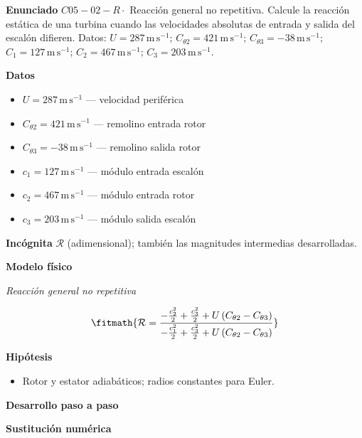 \documentclass[10pt,openany]{book}
\begin{document}
\begin{tcolorbox}[title={Problema resuelto 2}, studiumworked, breakable]

\noindent\textbf{Enunciado}
\(C05-02-R \cdot\) Reacción general no repetitiva. Calcule la reacción estática de una turbina cuando las velocidades absolutas de entrada y salida del escalón difieren. Datos: \(U=287\, \mathrm{m}\,\mathrm{s}^{-1}\); \(C_{\theta2}=421\, \mathrm{m}\,\mathrm{s}^{-1}\); \(C_{\theta3}=-38\, \mathrm{m}\,\mathrm{s}^{-1}\); \(C_1=127\, \mathrm{m}\,\mathrm{s}^{-1}\); \(C_2=467\, \mathrm{m}\,\mathrm{s}^{-1}\); \(C_3=203\, \mathrm{m}\,\mathrm{s}^{-1}\).

\noindent\textbf{Datos}
\begin{itemize}
\item $U = 287\,\mathrm{m}\,\mathrm{s}^{-1}$ — velocidad periférica
\item $C_{\theta 2} = 421\,\mathrm{m}\,\mathrm{s}^{-1}$ — remolino entrada rotor
\item $C_{\theta 3} = -38\,\mathrm{m}\,\mathrm{s}^{-1}$ — remolino salida rotor
\item $c_{1} = 127\,\mathrm{m}\,\mathrm{s}^{-1}$ — módulo entrada escalón
\item $c_{2} = 467\,\mathrm{m}\,\mathrm{s}^{-1}$ — módulo entrada rotor
\item $c_{3} = 203\,\mathrm{m}\,\mathrm{s}^{-1}$ — módulo salida escalón
\end{itemize}

\noindent\textbf{Incógnita}
$\mathcal{R}$ (adimensional); también las magnitudes intermedias desarrolladas.

\noindent\textbf{Modelo físico}

\noindent\textit{Reacción general no repetitiva}

\[
\fitmath{\mathcal R=\frac{- \frac{c_{2}^{2}}{2} + \frac{c_{3}^{2}}{2} + U \left(C_{\theta 2} - C_{\theta 3}\right)}{- \frac{c_{1}^{2}}{2} + \frac{c_{3}^{2}}{2} + U \left(C_{\theta 2} - C_{\theta 3}\right)}}
\]

\noindent\textbf{Hipótesis}
\begin{itemize}
\item Rotor y estator adiabáticos; radios constantes para Euler.
\end{itemize}

\noindent\textbf{Desarrollo paso a paso}



\noindent\textbf{Sustitución numérica}


\end{tcolorbox}
\end{document}
